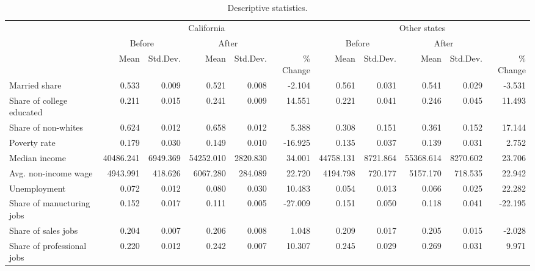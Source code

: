
\begin{landscape}
\begin{longtable}[c]{lrrrrrrrrrr}
\caption{\label{tab:desc-stat}Descriptive statistics.}\\
\toprule
\multicolumn{1}{c}{ } & \multicolumn{5}{c}{California} & \multicolumn{5}{c}{Other states} \\
\cmidrule(l{3pt}r{3pt}){2-6} \cmidrule(l{3pt}r{3pt}){7-11}
\multicolumn{1}{c}{ } & \multicolumn{2}{c}{Before} & \multicolumn{2}{c}{After} & \multicolumn{1}{c}{ } & \multicolumn{2}{c}{Before} & \multicolumn{2}{c}{After} & \multicolumn{1}{c}{ } \\
\cmidrule(l{3pt}r{3pt}){2-3} \cmidrule(l{3pt}r{3pt}){4-5} \cmidrule(l{3pt}r{3pt}){7-8} \cmidrule(l{3pt}r{3pt}){9-10}
 & Mean & Std.Dev. & Mean & Std.Dev. & \% Change & Mean & Std.Dev. & Mean & Std.Dev. & \% Change\\
\midrule
Married share & 0.533 & 0.009 & 0.521 & 0.008 & -2.104 & 0.561 & 0.031 & 0.541 & 0.029 & -3.531\\
Share of college educated & 0.211 & 0.015 & 0.241 & 0.009 & 14.551 & 0.221 & 0.041 & 0.246 & 0.045 & 11.493\\
Share of non-whites & 0.624 & 0.012 & 0.658 & 0.012 & 5.388 & 0.308 & 0.151 & 0.361 & 0.152 & 17.144\\
Poverty rate & 0.179 & 0.030 & 0.149 & 0.010 & -16.925 & 0.135 & 0.037 & 0.139 & 0.031 & 2.752\\
Median income & 40486.241 & 6949.369 & 54252.010 & 2820.830 & 34.001 & 44758.131 & 8721.864 & 55368.614 & 8270.602 & 23.706\\
\addlinespace
Avg. non-income wage & 4943.991 & 418.626 & 6067.280 & 284.089 & 22.720 & 4194.798 & 720.177 & 5157.170 & 718.535 & 22.942\\
Unemployment & 0.072 & 0.012 & 0.080 & 0.030 & 10.483 & 0.054 & 0.013 & 0.066 & 0.025 & 22.282\\
Share of manucturing jobs & 0.152 & 0.017 & 0.111 & 0.005 & -27.009 & 0.151 & 0.050 & 0.118 & 0.041 & -22.195\\
Share of sales jobs & 0.204 & 0.007 & 0.206 & 0.008 & 1.048 & 0.209 & 0.017 & 0.205 & 0.015 & -2.028\\
Share of professional jobs & 0.220 & 0.012 & 0.242 & 0.007 & 10.307 & 0.245 & 0.029 & 0.269 & 0.031 & 9.971\\
\bottomrule
\end{longtable}
\end{landscape}
